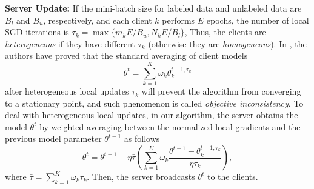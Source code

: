 \documentclass[twoside,journal]{IEEEtran}
\newtheorem{remark}{Remark}
\begin{document}
\textbf{ Server Update:} If the mini-batch size for labeled data and unlabeled data are $B_l$ and $B_u$, respectively,  and  each client $k$ performs $E$ epochs, the number of local SGD iterations is $\tau_k=\max\{m_kE/B_u,N_kE/B_l\}$,  Thus, the clients are \emph{heterogeneous} if they have different $\tau_k$
(otherwise they are \emph{homogeneous}). In \cite{wang2020tackling}, the authors have proved that the standard averaging of client models \cite{McMahan2017}
$$
\theta^t =  \sum_{k=1}^K\omega_k\theta_k^{t-1,\tau_k}
$$
after heterogeneous local updates $\tau_k$ will prevent the algorithm from converging to a stationary point, and  such phenomenon is called \emph{objective inconsistency}. To deal with heterogeneous local updates, in our algorithm, the server obtains the  model $\theta^t$ by weighted averaging between the normalized local gradients  and the previous model parameter $\theta^{t-1}$ as follows
$$\theta^t = \theta^{t-1} - \eta\bar{\tau} \left( \sum_{k=1}^K\omega_k\frac{\theta^{t-1}-\theta_k^{t-1,\tau_k}}{\eta \tau_k}\right),
$$
where $\bar{\tau}=\sum_{k=1}^K\omega_k\tau_k$. Then, the server broadcasts $\theta^t$ to the clients.









\end{document}
